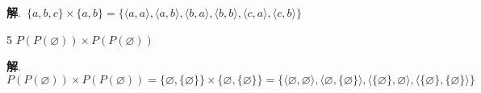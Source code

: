 \documentclass[12pt]{article}
\newenvironment{firstlayer}%
{\begin{list}{}{\renewcommand{\makelabel}[1]{\textbf{##1}.\hfil}
}}
{\end{list}}
\newenvironment{secondlayer}%
{\begin{list}{}{\renewcommand{\makelabel}[1]{(##1)\hfil}
}}
{\end{list}}
\providecommand{\sol}{\textbf{解}.~}
\begin{document}
\begin{CJK}{UTF8}{gbsn}
\begin{firstlayer}
\begin{secondlayer}
    \sol $\{ a,b,c \} \times \{ a,b \}=\{ \langle a,a \rangle,\langle a,b \rangle,\langle b,a \rangle,\langle b,b \rangle, \langle c,a \rangle, \langle c,b \rangle \}$
    \item[5]$P(P(\varnothing))\times P(P(\varnothing))$
    
    \sol $P(P(\varnothing))\times P(P(\varnothing))=\{ \varnothing, \{ \varnothing \} \} \times \{ \varnothing, \{ \varnothing \} \}=\{ \langle \varnothing,\varnothing\rangle,\langle \varnothing,\{ \varnothing\}\rangle,\langle \{ \varnothing \},\varnothing \rangle,\langle \{ \varnothing\},\{ \varnothing\} \rangle \}$
  \end{secondlayer}
\end{firstlayer}

\end{CJK}
\end{document}
